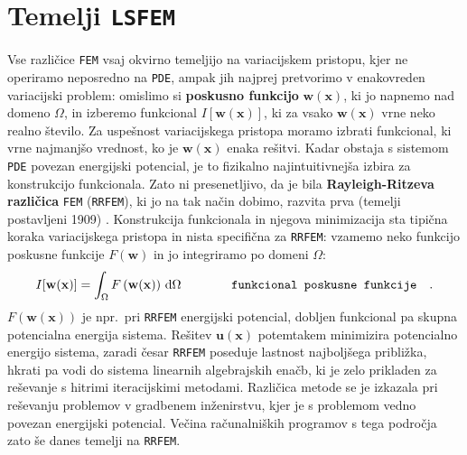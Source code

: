 \section{Temelji \texttt{LSFEM}}

Vse različice \texttt{FEM} vsaj okvirno temeljijo na variacijskem pristopu, kjer ne operiramo neposredno na \texttt{PDE}, ampak jih najprej pretvorimo v enakovreden variacijski problem: omislimo si \textbf{poskusno funkcijo} $\mathbf{w}(\mathbf{x})$, ki jo napnemo nad domeno $\Omega$, in izberemo funkcional $I[\mathbf{w}(\mathbf{x})]$, ki za vsako $\mathbf{w}(\mathbf{x})$ vrne neko realno število. Za uspešnost variacijskega pristopa moramo izbrati funkcional, ki vrne najmanjšo vrednost, ko je $\mathbf{w}(\mathbf{x})$ enaka rešitvi. Kadar obstaja s sistemom \texttt{PDE} povezan energijski potencial, je to fizikalno najintuitivnejša izbira za konstrukcijo funkcionala. Zato ni presenetljivo, da je bila \textbf{Rayleigh-Ritzeva različica} \texttt{FEM} (\texttt{RRFEM}), ki jo na tak način dobimo, razvita prva (temelji postavljeni 1909) \cite{RitzW-Variationsprobleme}. Konstrukcija funkcionala in njegova minimizacija sta tipična koraka variacijskega pristopa in nista specifična za \texttt{RRFEM}: vzamemo neko funkcijo poskusne funkcije $F\left(\mathbf{w}\right)$ in jo integriramo po domeni $\Omega$:
\begin{equation}
	I[\mathbf{w(x)}] = \int_{\Omega} F\left(\mathbf{w(x)}\right) \, \mathrm{d} \Omega \hspace{1.4cm} \texttt{funkcional poskusne funkcije} \quad .
	\label{eq:GeneralFunctional}
\end{equation}
$F\left(\mathbf{w}(\mathbf{x})\right)$ je npr.\ pri \texttt{RRFEM} energijski potencial, dobljen funkcional pa skupna potencialna energija sistema. Rešitev $\mathbf{u}(\mathbf{x})$ potemtakem minimizira potencialno energijo sistema, zaradi česar \texttt{RRFEM} poseduje last\-nost najboljšega približka, hkrati pa vodi do sistema linearnih algebrajskih enačb, ki je zelo prikladen za reševanje s hitrimi iteracijskimi metodami. Različica metode se je izkazala pri reševanju problemov v gradbenem inženirstvu, kjer je s problemom vedno povezan energijski potencial. Večina računalniških programov s tega področja zato še danes temelji na \texttt{RRFEM}.

